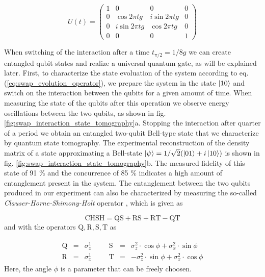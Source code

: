 \begin{equation}
	U(t)  =  \left( \begin{array}{cccc} 1 & 0 & 0 & 0 \\ 0 & \cos{2 \pi t g} & i\sin{2 \pi t g} & 0 \\ 0 & i\sin{2 \pi t g} & \cos{2 \pi t g} & 0 \\ 0 & 0 & 0 & 1 \end{array} \right) \label{eq:swap_evolution_operator}
\end{equation}


When switching of the interaction after a time $t_{\pi/2} = 1/8 g$ we can create entangled qubit states and realize a universal quantum gate, as will be explained later. First, to characterize the state evoluation of the system according to eq. (\ref{eq:swap_evolution_operator}), we prepare the system in the state $\left| 10 \right>$ and switch on the interaction between the qubits for a given amount of time. When measuring the state of the qubits after this operation we observe energy oscillations between the two qubits, as shown in fig. \ref{fig:swap_interaction_state_tomography}a. Stopping the interaction after quarter of a period we obtain an entangled two-qubit Bell-type state that we characterize by quantum state tomography. The experimental reconstruction of the density matrix of a state approximating a Bell-state $\left| \psi \right> = 1/\sqrt{2}(\left| 01 \right>+i\left| 10 \right>)$ is shown in fig. \ref{fig:swap_interaction_state_tomography}b. The measured fidelity of this state of 91 \% and the concurrence of 85 \% indicates a high amount of entanglement present in the system. The entanglement between the two qubits produced in our experiment can also be characterized by measuring the so-called {\it Clauser-Horne-Shimony-Holt} operator \citep{clauser_proposed_1969}, which is given as

\begin{equation}
\mathrm{CHSH} = \mathrm{QS}+\mathrm{RS}+\mathrm{RT}-\mathrm{QT}
\end{equation}
and with the operators $\mathrm{Q,R,S,T}$ as

\begin{eqnarray}
	\begin{array}{cccccccc}
		\mathrm{Q} & = & \sigma_z^1 &&& \mathrm{S} & = & \sigma_z^2\cdot \cos{\phi}+\sigma_x^2 \cdot \sin{\phi} \\
		\mathrm{R} & = & \sigma_x^1 &&& \mathrm{T} & = & -\sigma_z^2\cdot \sin{\phi}+\sigma_x^2 \cdot \cos{\phi}
	\end{array}
\end{eqnarray} 
Here, the angle $\phi$ is a parameter that can be freely choosen.

